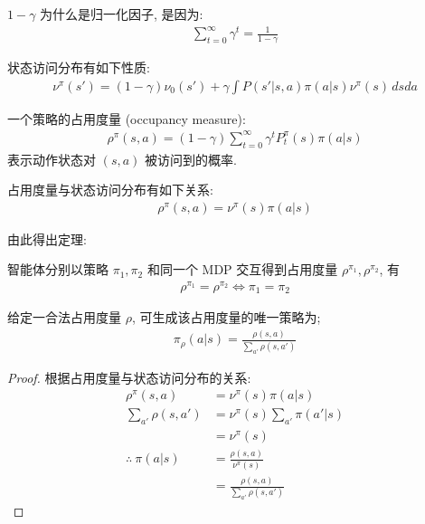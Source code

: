 $1-\gamma$ 为什么是归一化因子, 是因为: 
\begin{align*}
    \sum_{t=0}^\infty \gamma^t = \frac{1}{1-\gamma}
\end{align*}

状态访问分布有如下性质:
\begin{align*}
    \nu^\pi(s')=(1-\gamma)\nu_0(s') + \gamma \int P(s'|s, a)\pi(a|s)\nu^\pi(s) \,dsda 
\end{align*}

\begin{definition}[占用度量]
    一个策略的占用度量 (occupancy measure):
    \begin{align*}
        \rho^\pi(s,a) = (1-\gamma) \sum_{t=0}^\infty \gamma^t P_t^\pi(s)\pi(a|s)
    \end{align*}
    表示动作状态对 $(s,a)$ 被访问到的概率. 
\end{definition}

占用度量与状态访问分布有如下关系:
\begin{align*}
    \rho^\pi(s,a)=\nu^\pi(s)\pi(a|s)
\end{align*}

由此得出定理:
\begin{theorem}
    智能体分别以策略 $\pi_1, \pi_2$ 和同一个 MDP 交互得到占用度量 $\rho^{\pi_1}, \rho^{\pi_2}$, 有
    \begin{align*}
        \rho^{\pi_1} = \rho^{\pi_2} \iff \pi_1 = \pi_2
    \end{align*}
\end{theorem}

\begin{theorem}
    给定一合法占用度量 $\rho$, 可生成该占用度量的唯一策略为;
    \begin{align*}
        \pi_\rho(a|s) = \frac{\rho(s,a)}{\sum_{a'}\rho(s,a')}
    \end{align*}
    
\end{theorem}

\begin{proof}
    根据占用度量与状态访问分布的关系: 
    \begin{align*}
        \rho^\pi(s,a)&=\nu^\pi(s)\pi(a|s)\\
        \sum_{a'}\rho(s,a') &= \nu^\pi(s)\sum_{a'}\pi(a'|s) \\
        &= \nu^\pi(s) \\
        \therefore\ \pi(a|s)  &=\frac{\rho(s,a)}{\nu^\pi(s)} \\
        &=\frac{\rho(s,a)}{\sum_{a'}\rho(s,a')}
    \end{align*}
\end{proof}


